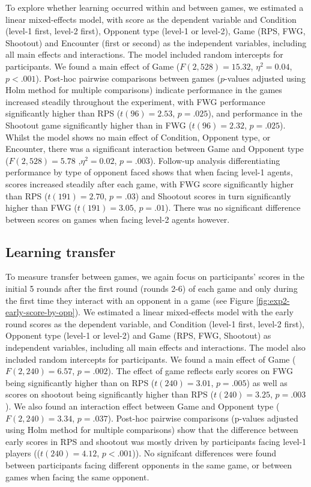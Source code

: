 \documentclass[smallextended]{svjour3}       %
\begin{document}
To explore whether learning occurred within and between games, we
estimated a linear mixed-effects model, with score as the dependent
variable and Condition (level-1 first, level-2 first), Opponent type
(level-1 or level-2), Game (RPS, FWG, Shootout) and Encounter (first or
second) as the independent variables, including all main effects and
interactions. The model included random intercepts for participants. We
found a main effect of Game (\(F(2,528) = 15.32\), \(\eta^{2} = 0.04\),
\(p < .001\)). Post-hoc pairwise comparisons between games (\(p\)-values
adjusted using Holm method for multiple comparisons) indicate
performance in the games increased steadily throughout the experiment,
with FWG performance significantly higher than RPS (\(t(96) =2.53\),
\(p = .025\)), and performance in the Shootout game significantly higher
than in FWG (\(t(96) = 2.32\), \(p = .025\)). Whilst the model shows no
main effect of Condition, Opponent type, or Encounter, there was a
significant interaction between Game and Opponent type
(\(F(2, 528) = 5.78\) ,\(\eta^{2} = 0.02\), \(p = .003\)). Follow-up
analysis differentiating performance by type of opponent faced shows
that when facing level-1 agents, scores increased steadily after each
game, with FWG score significantly higher than RPS (\(t(191) = 2.70\),
\(p = .03\)) and Shootout scores in turn significantly higher than FWG
(\(t(191) = 3.05\), \(p = .01\)). There was no significant difference
between scores on games when facing level-2 agents however.

\hypertarget{learning-transfer-1}{%
\subsection{Learning transfer}\label{learning-transfer-1}}

To measure transfer between games, we again focus on participants'
scores in the initial 5 rounds after the first round (rounds 2-6) of
each game and only during the first time they interact with an opponent
in a game (see Figure \ref{fig:exp2-early-score-by-opp}). We estimated a
linear mixed-effects model with the early round scores as the dependent
variable, and Condition (level-1 first, level-2 first), Opponent type
(level-1 or level-2) and Game (RPS, FWG, Shootout) as independent
variables, including all main effects and interactions. The model also
included random intercepts for participants. We found a main effect of
Game (\(F(2,240) = 6.57\), \(p = .002\)). The effect of game reflects
early scores on FWG being significantly higher than on RPS
(\(t(240) = 3.01\), \(p = .005\)) as well as scores on shootout being
significantly higher than RPS (\(t(240) = 3.25\), \(p = .003\)). We also
found an interaction effect between Game and Opponent type
(\(F(2,240) = 3.34\), \(p = .037\)). Post-hoc pairwise comparisons
(p-values adjusted using Holm method for multiple comparisons) show that
the difference between early scores in RPS and shootout was mostly
driven by participants facing level-1 players ((\(t(240) = 4.12\),
\(p < .001\))). No signifcant differences were found between
participants facing different opponents in the same game, or between
games when facing the same opponent.
\end{document}
